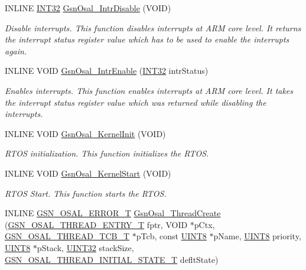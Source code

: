 \begin{DoxyCompactItemize}
\item 
INLINE \hyperlink{a00660_ga63021d67d54286c2163bcdb43a6f2569}{INT32} \hyperlink{a00628_ga1ed551b8d69faf123769e95f1d1a6a7b}{GsnOsal\_\-IntrDisable} (VOID)
\begin{DoxyCompactList}\small\item\em Disable interrupts. This function disables interrupts at ARM core level. It returns the interrupt status register value which has to be used to enable the interrupts again. \end{DoxyCompactList}\item 
INLINE VOID \hyperlink{a00628_ga2b636bd2ea78e766272d3b316fc56caf}{GsnOsal\_\-IntrEnable} (\hyperlink{a00660_ga63021d67d54286c2163bcdb43a6f2569}{INT32} intrStatus)
\begin{DoxyCompactList}\small\item\em Enables interrupts. This function enables interrupts at ARM core level. It takes the interrupt status register value which was returned while disabling the interrupts. \end{DoxyCompactList}\item 
INLINE VOID \hyperlink{a00628_gae0bcbaa3cb7b92d2df26e8894b6b4ee3}{GsnOsal\_\-KernelInit} (VOID)
\begin{DoxyCompactList}\small\item\em RTOS initialization. This function initializes the RTOS. \end{DoxyCompactList}\item 
INLINE VOID \hyperlink{a00628_gafe9fabb4c27bd3a4544da84919cd1789}{GsnOsal\_\-KernelStart} (VOID)
\begin{DoxyCompactList}\small\item\em RTOS Start. This function starts the RTOS. \end{DoxyCompactList}\item 
INLINE \hyperlink{a00659_ga36216a7aacd1d5024bc7b8bf39c3f46b}{GSN\_\-OSAL\_\-ERROR\_\-T} \hyperlink{a00628_ga1b2c29cb19f0f5a40f765072e570ee83}{GsnOsal\_\-ThreadCreate} (\hyperlink{a00628_ga62a09641cac90719fc0cdb5f204df09b}{GSN\_\-OSAL\_\-THREAD\_\-ENTRY\_\-T} fptr, VOID $\ast$pCtx, \hyperlink{a00628_ga43c1eefe78fa26e478301976f96ac31f}{GSN\_\-OSAL\_\-THREAD\_\-TCB\_\-T} $\ast$pTcb, const \hyperlink{a00660_gab27e9918b538ce9d8ca692479b375b6a}{UINT8} $\ast$pName, \hyperlink{a00660_gab27e9918b538ce9d8ca692479b375b6a}{UINT8} priority, \hyperlink{a00660_gab27e9918b538ce9d8ca692479b375b6a}{UINT8} $\ast$pStack, \hyperlink{a00660_gae1e6edbbc26d6fbc71a90190d0266018}{UINT32} stackSize, \hyperlink{a00628_ga0aaa82e357c4ce95100dc1df18ec3363}{GSN\_\-OSAL\_\-THREAD\_\-INITIAL\_\-STATE\_\-T} defltState)

\end{DoxyCompactItemize}

